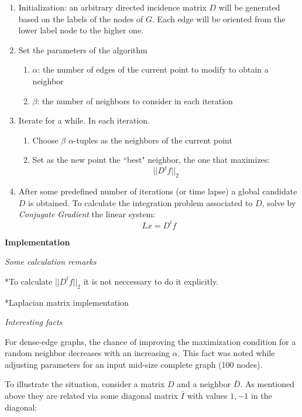 \documentclass[a4paper,11pt]{article}
\begin{document}
\begin{enumerate}
	\item Initialization: an arbitrary directed incidence matrix $D$ 
	will be generated based on the labels of the nodes of $G$. Each edge 
	will be oriented from the lower label node to the higher one. 
	\item Set the parameters of the algorithm
	\begin{enumerate}
		\item $\alpha$: the number of edges of the current point to 
		modify to obtain a neighbor
		\item $\beta$: the number of neighbors to consider in each 
		iteration
	\end{enumerate}
	\item Iterate for a while. In each iteration.
	\begin{enumerate}
		\item Choose $\beta$ $\alpha$-tuples as the neighbors of the
		current point
		\item Set as the new point the ``best" neighbor, the one that 
		maximizes:
		$$||D^t f||_2$$
 	\end{enumerate}
	\item After some predefined number of iterations (or time lapse) a  
	global candidate $D$ is obtained. To calculate the integration 
	problem associated to $D$, solve by \textit{Conjugate Gradient} 
	the linear system:
	$$L x = D^t f$$
\end{enumerate}

\bigskip

\textbf{Implementation}

\bigskip

\emph{Some calculation remarks}

\bigskip

*To calculate $||D^t f||_2$ it is not neccessary to do it explicitly.

*Laplacian matrix implementation

\bigskip

\emph{Interesting facts}

\bigskip

For dense-edge graphs, the chance of improving the maximization 
condition for a random neighbor decreases with an increasing $\alpha$. 
This fact was noted while adjusting parameters for an input mid-size 
complete graph (100 nodes). 

\bigskip

To illustrate the situation, consider a matrix $D$ and a neighbor 
$\bar{D}$. As mentioned above they are related via some diagonal matrix 
$\bar{I}$ with values $1,-1$ in the diagonal:
\end{document}
